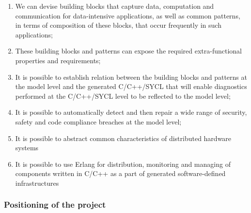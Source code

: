 \documentclass[a4paper,11pt]{article}
\begin{document}
\begin{enumerate}[{A}1)]
\item
We can devise building blocks that capture data, computation and communication for data-intensive applications, as well as common patterns, in terms of composition of these blocks, that occur frequently in such applications;
\item
These building blocks and patterns can expose the required extra-functional properties and requirements;
\item
It is possible to establish relation between the building blocks and patterns at the model level and the generated C/C++/SYCL that will enable diagnostics performed at the C/C++/SYCL level to be reflected to the model level;
\item
It is possible to automatically detect and then repair a wide range of security, safety and code compliance breaches at the model level;
\item It is possible to abstract common characteristics of distributed hardware systems 
\item It is possible to use Erlang for distribution, monitoring and managing of components written in C/C++ as a part of generated software-defined infrastructures

\end{enumerate}

% 

\subsubsection{Positioning of the project}
% 
% 
\end{document}
